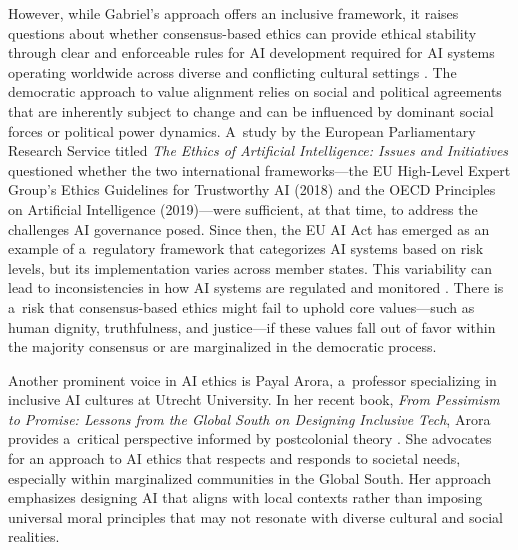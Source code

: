 \documentclass[%
  manuscript=article,
  year=2024,
  volume=77,
  doi=00000.000,
]{zfn}
\begin{document}
However, while Gabriel's approach offers an inclusive framework, it raises questions about whether consensus-based ethics can provide ethical stability through clear and enforceable rules for AI development required for AI systems operating worldwide across diverse and conflicting cultural settings 
\parencite[][]{correa_worldwide_2023}. %
 The democratic approach to value alignment relies on social and political agreements that are inherently subject to change and can be influenced by dominant social forces or political power dynamics. A~study by the European Parliamentary Research Service 
\parencite[][]{european_parliament_directorate_general_for_parliamentary_research_services_artificial_2020} %
 titled \textit{The Ethics of Artificial Intelligence: Issues and Initiatives} questioned whether the two international frameworks---the EU High-Level Expert Group's Ethics Guidelines for Trustworthy AI (2018) and the OECD Principles on Artificial Intelligence (2019)---were sufficient, at that time, to address the challenges AI governance posed. Since then, the EU AI Act has emerged as an example of a~regulatory framework that categorizes AI systems based on risk levels, but its implementation varies across member states. This variability can lead to inconsistencies in how AI systems are regulated and monitored 
\parencite[][]{formosa_ethics_2024}. %
 There is a~risk that consensus-based ethics might fail to uphold core values---such as human dignity, truthfulness, and justice---if these values fall out of favor within the majority consensus or are marginalized in the democratic process.



Another prominent voice in AI ethics is Payal Arora, a~professor specializing in inclusive AI cultures at Utrecht University. In her recent book, \textit{From Pessimism to Promise: Lessons from the Global South on Designing Inclusive Tech}, Arora provides a~critical perspective informed by postcolonial theory 
\parencite[][]{arora_pessimism_2024}. %
 She advocates for an approach to AI ethics that respects and responds to societal needs, especially within marginalized communities in the Global South. Her approach emphasizes designing AI that aligns with local contexts rather than imposing universal moral principles that may not resonate with diverse cultural and social realities.
\end{document}
